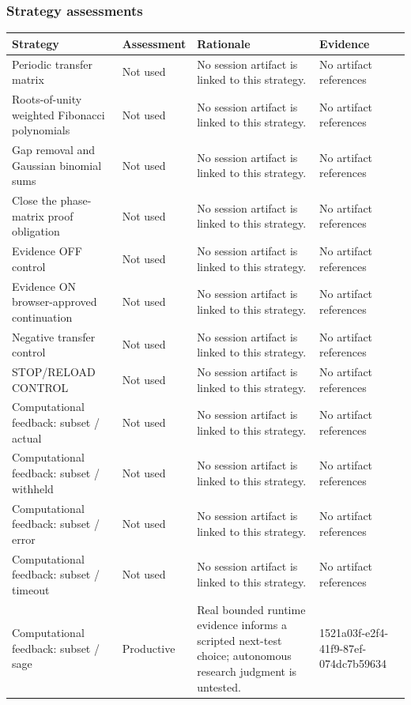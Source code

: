 \documentclass[11pt]{article}
\begin{document}
\subsubsection*{Strategy assessments}
\begin{longtable}{>{\raggedright\arraybackslash}p{.16\linewidth}>{\raggedright\arraybackslash}p{.15\linewidth}>{\raggedright\arraybackslash}p{.40\linewidth}>{\raggedright\arraybackslash}p{.17\linewidth}}
\toprule Strategy & Assessment & Rationale & Evidence \\
\midrule\endhead
Periodic transfer matrix & Not used & No session artifact is linked to this strategy. & No artifact references \\
Roots-of-unity weighted Fibonacci polynomials & Not used & No session artifact is linked to this strategy. & No artifact references \\
Gap removal and Gaussian binomial sums & Not used & No session artifact is linked to this strategy. & No artifact references \\
Close the phase-matrix proof obligation & Not used & No session artifact is linked to this strategy. & No artifact references \\
Evidence OFF control & Not used & No session artifact is linked to this strategy. & No artifact references \\
Evidence ON browser-approved continuation & Not used & No session artifact is linked to this strategy. & No artifact references \\
Negative transfer control & Not used & No session artifact is linked to this strategy. & No artifact references \\
STOP/RELOAD CONTROL & Not used & No session artifact is linked to this strategy. & No artifact references \\
Computational feedback: subset / actual & Not used & No session artifact is linked to this strategy. & No artifact references \\
Computational feedback: subset / withheld & Not used & No session artifact is linked to this strategy. & No artifact references \\
Computational feedback: subset / error & Not used & No session artifact is linked to this strategy. & No artifact references \\
Computational feedback: subset / timeout & Not used & No session artifact is linked to this strategy. & No artifact references \\
Computational feedback: subset / sage & Productive & Real bounded runtime evidence informs a scripted next-test choice; autonomous research judgment is untested. & 1521a03f-e2f4-41f9-87ef-074dc7b59634 \\
\bottomrule
\end{longtable}
\end{document}
